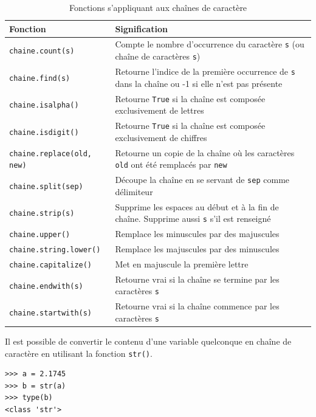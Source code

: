 \documentclass[12pt, a4paper]{article}
\begin{document}
\begin{table}[H]
	\begin{center}
		\begin{tabular}{|l|p{11cm}|}
			\hline
			\textbf{Fonction} & \textbf{Signification} \\
			\hline
			\lstinline{chaine.count(s)} & Compte le nombre d’occurrence du caractère \lstinline{s} (ou chaîne de caractères \lstinline{s})\\
			\lstinline{chaine.find(s)} & Retourne l'indice de la première occurrence de \lstinline{s} dans la chaîne ou -1 si elle n'est pas présente \\
			\lstinline{chaine.isalpha()} & Retourne \lstinline{True} si la chaîne est composée exclusivement de lettres \\
			\lstinline{chaine.isdigit()} & Retourne \lstinline{True} si la chaîne est composée exclusivement de chiffres \\
			\lstinline{chaine.replace(old, new)} & Retourne un copie de la chaîne où les caractères \lstinline{old} ont été remplacés par \lstinline{new} \\
			\lstinline{chaine.split(sep)} & Découpe la chaîne en se servant de \lstinline{sep} comme délimiteur \\
			\lstinline{chaine.strip(s)} & Supprime les espaces au début et à la fin de chaîne. Supprime aussi \lstinline{s} s'il est renseigné \\
			\lstinline{chaine.upper()} & Remplace les minuscules par des majuscules \\
			\lstinline{chaine.string.lower()} & Remplace les majuscules par des minuscules \\
			\lstinline{chaine.capitalize()} & Met en majuscule la première lettre \\
			\lstinline{chaine.endwith(s)} & Retourne vrai si la chaîne se termine par les caractères \lstinline{s} \\
			\lstinline{chaine.startwith(s)} & Retourne vrai si la chaîne commence par les caractères \lstinline{s} \\
			\hline
		\end{tabular}
		\caption{Fonctions s'appliquant aux chaînes de caractère}
		\label{tab:fonctions_chaines}
	\end{center}
\end{table}

Il est possible de convertir le contenu d'une variable quelconque en chaîne de caractère en utilisant la fonction \lstinline{str()}. 
\begin{lstlisting}
>>> a = 2.1745
>>> b = str(a)
>>> type(b)
<class 'str'>
\end{lstlisting}
\end{document}
